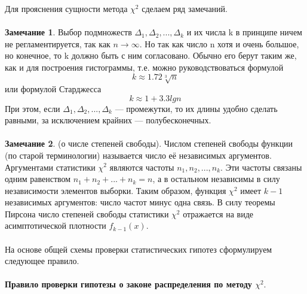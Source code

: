 \documentclass[../body.tex]{subfiles}
\begin{document}
Для прояснения сущности метода $\chi^{2}$ сделаем ряд замечаний.
\\\\
\textbf{Замечание 1}. Выбор подмножеств $\Delta_{1},\Delta_{2}, ... ,\Delta_{k}$ и их числа k в принципе ничем не регламентируется, так как $n \rightarrow \infty$. Но так как число n хотя и очень большое, но конечное, то k должно быть с ним согласовано. Обычно его берут таким же, как и для построения гистограммы, т.е. можно руководствоваться формулой
\begin{equation}
	k \approx 1.72\sqrt[3]{n}
	\label{k_1}
\end{equation}
или формулой Старджесса
\begin{equation}
	k \approx 1 + 3.3lgn
\end{equation}
При этом, если  $\Delta_{1},\Delta_{2}, ... ,\Delta_{k}$ — промежутки, то их длины удобно сделать равными, за исключением крайних — полубесконечных.
\\\\
\textbf{Замечание 2}. (о числе степеней свободы).
Числом степеней свободы функции (по старой терминологии) называется число её независимых аргументов. Аргументами статистики $\chi^{2}$ являются частоты $n_{1},n_{2}, ... ,n_{k}$. Эти частоты связаны одним равенством $n_{1} + n_{2} + ... + n_{k}  = n$, а в остальном независимы в силу независимости элементов выборки. Таким образом, функция $\chi^{2}$  имеет $k-1$ независимых аргументов: число частот минус одна связь. В силу теоремы Пирсона число степеней свободы статистики $\chi^{2}$  отражается на виде асимптотической плотности $f_{k - 1}(x)$.
\\\\
На основе общей схемы проверки статистических гипотез сформулируем следующее правило.
\\\\
\textbf{Правило проверки гипотезы о законе распределения по методу $\chi^{2}$}.
\end{document}
